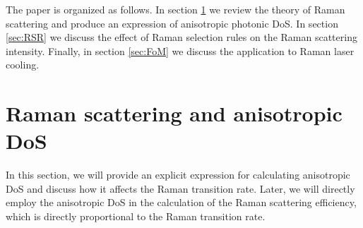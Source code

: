 \documentclass[%
 reprint,
superscriptaddress,
 amsmath,amssymb,
 aps,
pra,
]{revtex4-1}
\begin{document}
The paper is organized as follows. In section \ref{sec:ADoS} we review the theory of Raman scattering and produce an expression of anisotropic photonic DoS. In section \ref{sec:RSR} we discuss the effect of Raman selection rules on the Raman scattering intensity. Finally, in section \ref{sec:FoM} we discuss the application to Raman laser cooling.





\section{Raman scattering and anisotropic DoS}\label{sec:ADoS}


In this section, we will provide an explicit expression for calculating anisotropic DoS and discuss how it affects the Raman transition rate. Later, we will directly employ the anisotropic DoS in the calculation of the Raman scattering efficiency, which is directly proportional to the Raman transition rate.
\end{document}
